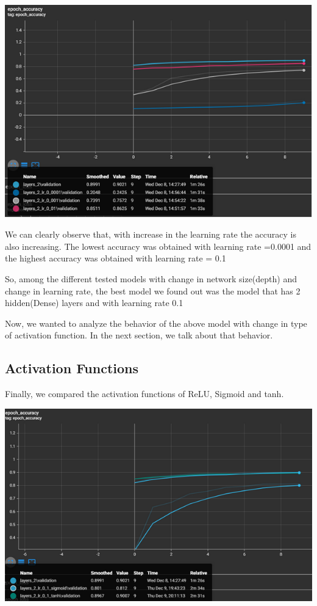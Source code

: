 \documentclass[12pt]{article}
\begin{document}
\includegraphics[scale=.75]{cnngraph2.PNG}

We can clearly observe that, with increase in the learning rate the accuracy is also increasing. The lowest accuracy was obtained with learning rate =0.0001 and the highest accuracy was obtained with learning rate = 0.1

So, among the different tested models with change in network size(depth) and change in learning rate, the best model we found out was the model that has 2 hidden(Dense) layers and with learning rate 0.1

Now, we wanted to analyze the behavior of the above model with change in type of activation function. In the next section, we talk about that behavior.

\subsection{Activation Functions}

Finally, we compared the activation functions of ReLU, Sigmoid and tanh.

\includegraphics[scale=.75]{cnngraph3.PNG}
\end{document}
